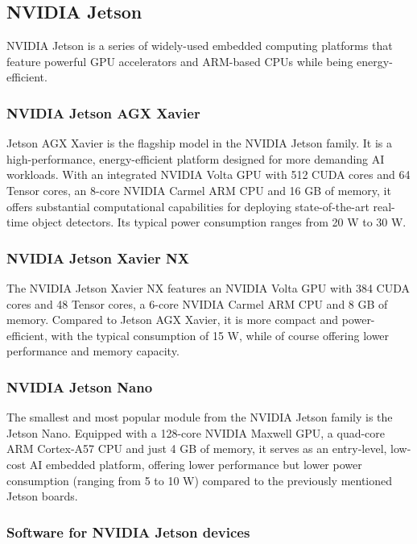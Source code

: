 \subsection{NVIDIA Jetson}
\label{Jetsons}

NVIDIA Jetson is a series of widely-used embedded computing platforms that
feature powerful GPU accelerators and ARM-based CPUs while being
energy-efficient.



\subsubsection{NVIDIA Jetson AGX Xavier}

Jetson AGX Xavier is the flagship model in the NVIDIA Jetson family. It is a
high-performance, energy-efficient platform designed for more demanding AI
workloads. With an integrated NVIDIA Volta GPU with 512 CUDA cores and 64 Tensor
cores, an 8-core NVIDIA Carmel ARM CPU and 16 GB of memory, it offers substantial
computational capabilities for deploying state-of-the-art real-time object
detectors. Its typical power consumption ranges from 20 W to 30 W.


\subsubsection{NVIDIA Jetson Xavier NX}

The NVIDIA Jetson Xavier NX features an NVIDIA Volta GPU with 384 CUDA cores and
48 Tensor cores, a 6-core NVIDIA Carmel ARM CPU and 8 GB of memory. Compared
to Jetson AGX Xavier, it is more compact and power-efficient, with the typical
consumption of 15 W, while of course offering lower performance and memory
capacity.


\subsubsection{NVIDIA Jetson Nano}

The smallest and most popular module from the NVIDIA Jetson family is the Jetson
Nano. Equipped with a 128-core NVIDIA Maxwell GPU, a quad-core ARM Cortex-A57
CPU and just 4 GB of memory, it serves as an entry-level, low-cost AI embedded
platform, offering lower performance but lower power consumption (ranging from 5
to 10 W) compared to the previously mentioned Jetson boards.


\subsubsection{Software for NVIDIA Jetson devices}


